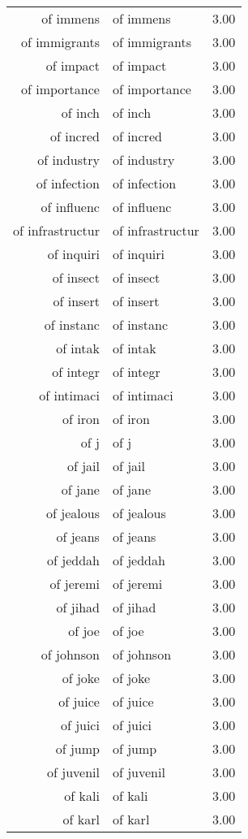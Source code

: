 \begin{table}[ht]
\begin{tabular}{rlr}
  of immens & of immens & 3.00 \\ 
  of immigrants & of immigrants & 3.00 \\ 
  of impact & of impact & 3.00 \\ 
  of importance & of importance & 3.00 \\ 
  of inch & of inch & 3.00 \\ 
  of incred & of incred & 3.00 \\ 
  of industry & of industry & 3.00 \\ 
  of infection & of infection & 3.00 \\ 
  of influenc & of influenc & 3.00 \\ 
  of infrastructur & of infrastructur & 3.00 \\ 
  of inquiri & of inquiri & 3.00 \\ 
  of insect & of insect & 3.00 \\ 
  of insert & of insert & 3.00 \\ 
  of instanc & of instanc & 3.00 \\ 
  of intak & of intak & 3.00 \\ 
  of integr & of integr & 3.00 \\ 
  of intimaci & of intimaci & 3.00 \\ 
  of iron & of iron & 3.00 \\ 
  of j & of j & 3.00 \\ 
  of jail & of jail & 3.00 \\ 
  of jane & of jane & 3.00 \\ 
  of jealous & of jealous & 3.00 \\ 
  of jeans & of jeans & 3.00 \\ 
  of jeddah & of jeddah & 3.00 \\ 
  of jeremi & of jeremi & 3.00 \\ 
  of jihad & of jihad & 3.00 \\ 
  of joe & of joe & 3.00 \\ 
  of johnson & of johnson & 3.00 \\ 
  of joke & of joke & 3.00 \\ 
  of juice & of juice & 3.00 \\ 
  of juici & of juici & 3.00 \\ 
  of jump & of jump & 3.00 \\ 
  of juvenil & of juvenil & 3.00 \\ 
  of kali & of kali & 3.00 \\ 
  of karl & of karl & 3.00 \\ 

\end{tabular}
\end{table}
